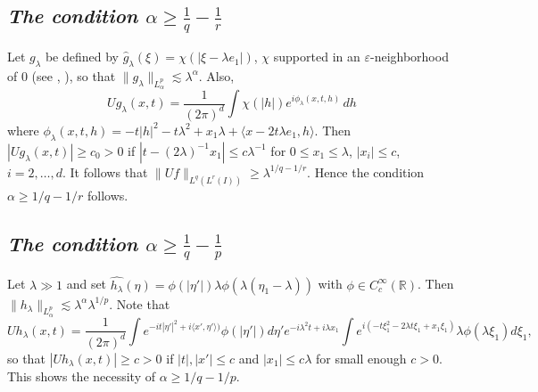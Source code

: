 \documentclass[11pt]{amsart}
\theoremstyle{definition}
\numberwithin{theorem}{section}
\numberwithin{definition}{section}
\numberwithin{equation}{section}
\def\inn#1#2{\langle#1,#2\rangle}
\newcommand{\R}{\mathbb{R}}
\renewcommand{\le}{\leqslant}
\renewcommand{\ge}{\geqslant}
\def\R{\mathbb R}
\def\inn#1#2{\langle#1,#2\rangle}
\def\lc{\lesssim}
\def\eps{\varepsilon}
\def\la{\lambda}             \def\La{\Lambda}
\def\bbR{{\mathbb {R}}}
\renewcommand{\le}{\leqslant}
\renewcommand{\ge}{\geqslant}
\begin{document}
\subsection{\it The condition   $\alpha\ge \frac1q-\frac1r$}
Let $g_\la$ be defined by $\widehat g_\la(\xi)= \chi(|\xi-\la e_1|)$, $\chi$ supported in an $\eps$-neighborhood of $0$
(see  \cite{dake}, \cite{rose}), so that $\|g_\la\|_{L^p_\alpha} \lc \la^\alpha$.
Also, $$Ug_\la(x,t)= \frac{1}{(2\pi)^d}\int \chi(|h|) e^{i\phi_\la(x,t,h)}\,dh$$ where
$\phi_\la(x,t,h)=-t|h|^2-t\la^2+x_1\la +\inn {x-2t\la e_1}{h}$.
Then $|Ug_\la(x,t)|\ge c_0>0$ if $|t-(2\la)^{-1}x_1|\le c\la^{-1} $ for $0\le x_1\le \la$,
$|x_i|\le c$, $i=2,\dots, d$.
It follows that $\|Uf\|_{L^q(L^r(I))}\ge \la ^{1/q-1/r}$. Hence the condition
$\alpha\ge 1/q-1/r$ follows.

\subsection{ \it The condition   $\alpha\ge \frac1q-\frac1p$}
 Let $\lambda\gg 1$ and set $\widehat{h_\lambda}(\eta)=\phi(|\eta'|)\lambda\phi(\lambda(\eta_1-\lambda))$ with $\phi\in C_c^\infty(\R)$.  Then $\|h_\lambda\|_{L^p_{\alpha}}\lesssim \lambda^\alpha \lambda^{1/p}$. Note that
\[ Uh_\lambda(x,t)=\frac{1}{(2\pi)^d}\int e^{-it|\eta'|^2+i\inn {x'}{\eta'})} \phi(|\eta'|) d\eta'  e^{-i\lambda^2t+i\lambda x_1}
\int e^{i(-t\xi_1^2-2\lambda t\xi_1+x_1\xi_1)}
\lambda\phi(\lambda\xi_1) d\xi_1,\] so that $|Uh_\lambda(x,t)|\ge
c>0$ if $|t|, |x'|\le c$ and $|x_1|\le c\lambda$ for small enough
$c>0$. This shows the necessity of $\alpha\ge 1/q-1/p$.
\end{document}
